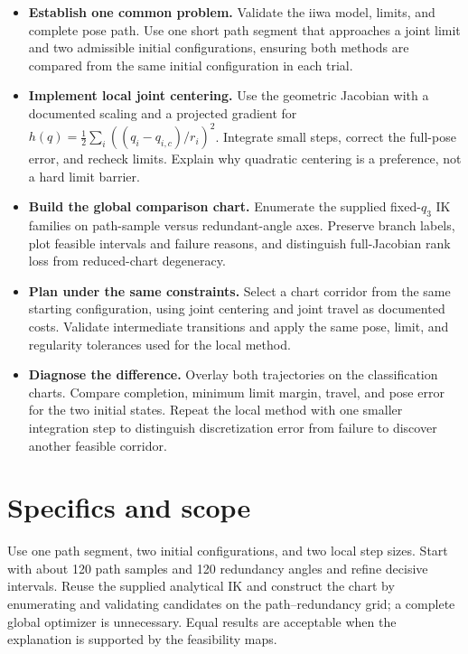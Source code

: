 \documentclass[11pt,a4paper]{article}
\begin{document}
\begin{itemize}
  \item \textbf{Establish one common problem.} Validate the iiwa model, limits,
and complete pose path. Use one short path segment that approaches a joint
limit and two admissible initial configurations, ensuring both methods are
compared from the same initial configuration in each trial.

  \item \textbf{Implement local joint centering.} Use the geometric Jacobian with
a documented scaling and a projected gradient for
$h(q)=\tfrac12\sum_i((q_i-q_{i,c})/r_i)^2$.
Integrate small steps, correct the full-pose error, and recheck limits.
Explain why quadratic centering is a preference, not a hard limit barrier.

  \item \textbf{Build the global comparison chart.} Enumerate the supplied
fixed-$q_3$ IK families on path-sample versus redundant-angle axes. Preserve
branch labels, plot feasible intervals and failure reasons, and distinguish
full-Jacobian rank loss from reduced-chart degeneracy.

  \item \textbf{Plan under the same constraints.} Select a chart corridor from the
same starting configuration, using joint centering and joint travel as
documented costs. Validate intermediate transitions and apply the same
pose, limit, and regularity tolerances used for the local method.

  \item \textbf{Diagnose the difference.} Overlay both trajectories on the
classification charts. Compare completion, minimum limit margin, travel,
and pose error for the two initial states. Repeat the local method with
one smaller integration step to distinguish discretization error from
failure to discover another feasible corridor.
\end{itemize}

\newpage
\section*{Specifics and scope}
Use one path segment, two initial configurations, and two local step
sizes. Start with about 120 path samples and 120 redundancy angles and
refine decisive intervals. Reuse the supplied analytical IK and construct the chart by
enumerating and validating candidates on the path--redundancy grid; a complete global optimizer is unnecessary. Equal results
are acceptable when the explanation is supported by the feasibility maps.
\end{document}
